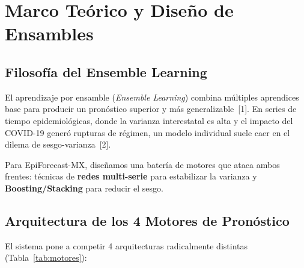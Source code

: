 \documentclass[12pt, letterpaper]{article}
\newcommand{\tabref}[1]{Tabla~\ref{#1}}
\begin{document}
\newpage

\section{Marco Teórico y Diseño de Ensambles}\label{sec:marco}

\subsection{Filosofía del Ensemble Learning}
El aprendizaje por ensamble (\textit{Ensemble Learning}) combina múltiples aprendices base para producir un pronóstico superior y más generalizable~[1]. En series de tiempo epidemiológicas, donde la varianza interestatal es alta y el impacto del COVID-19 generó rupturas de régimen, un modelo individual suele caer en el dilema de sesgo-varianza~[2].

Para EpiForecast-MX, diseñamos una batería de motores que ataca ambos frentes: técnicas de \textbf{redes multi-serie} para estabilizar la varianza y \textbf{Boosting/Stacking} para reducir el sesgo.

\subsection{Arquitectura de los 4 Motores de Pronóstico}

El sistema pone a competir 4 arquitecturas radicalmente distintas (\tabref{tab:motores}):
\end{document}
